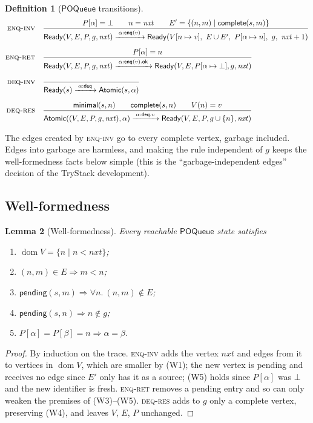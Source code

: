 \documentclass[11pt]{article}
\newtheorem{lemma}{Lemma}[section]
\theoremstyle{definition}
\newtheorem{definition}[lemma]{Definition}
\theoremstyle{remark}
\newcommand{\dom}{\mathop{\mathrm{dom}}}
\newcommand{\Ready}{\mathsf{Ready}}
\newcommand{\Atomic}{\mathsf{Atomic}}
\newcommand{\Enq}{\mathsf{enq}}
\newcommand{\Deq}{\mathsf{deq}}
\newcommand{\ok}{\mathsf{ok}}
\newcommand{\pending}{\mathsf{pending}}
\newcommand{\complete}{\mathsf{complete}}
\newcommand{\minimal}{\mathsf{minimal}}
\newcommand{\POQueue}{\mathsf{POQueue}}
\newcommand{\step}[1]{\xrightarrow{\;#1\;}}
\begin{document}
\begin{definition}[$\POQueue$ transitions]\label{def:poq-steps}
\begin{align*}
\textsc{enq-inv}\quad&
\frac{P[\alpha] = \bot \qquad n = \mathit{nxt} \qquad
  E' = \{(n, m) \mid \complete(s, m)\}}
 {\Ready(V, E, P, g, \mathit{nxt}) \step{\alpha:\Enq(v)}
  \Ready(V[n \mapsto v],\ E \cup E',\ P[\alpha \mapsto n],\ g,\ \mathit{nxt}+1)}
\\[6pt]
\textsc{enq-ret}\quad&
\frac{P[\alpha] = n}
 {\Ready(V, E, P, g, \mathit{nxt}) \step{\alpha:\Enq(v).\ok}
  \Ready(V, E, P[\alpha \mapsto \bot], g, \mathit{nxt})}
\\[6pt]
\textsc{deq-inv}\quad&
\frac{}
 {\Ready(s) \step{\alpha:\Deq} \Atomic(s, \alpha)}
\\[6pt]
\textsc{deq-res}\quad&
\frac{\minimal(s, n) \qquad \complete(s, n) \qquad V(n) = v}
 {\Atomic((V, E, P, g, \mathit{nxt}), \alpha) \step{\alpha:\Deq.v}
  \Ready(V, E, P, g \cup \{n\}, \mathit{nxt})}
\end{align*}
\end{definition}

The edges created by \textsc{enq-inv} go to every complete vertex, garbage
included.  Edges into garbage are harmless, and making the rule independent
of $g$ keeps the well-formedness facts below simple (this is the
``garbage-independent edges'' decision of the TryStack development).

\subsection{Well-formedness}

\begin{lemma}[Well-formedness]\label{lem:wf}
Every reachable $\POQueue$ state satisfies
\begin{enumerate}[label=(W\arabic*),nosep]
\item $\dom V = \{ n \mid n < \mathit{nxt} \}$;
\item $(n, m) \in E \Rightarrow m < n$;
\item $\pending(s, m) \Rightarrow \forall n.\ (n, m) \notin E$;
\item $\pending(s, n) \Rightarrow n \notin g$;
\item $P[\alpha] = P[\beta] = n \Rightarrow \alpha = \beta$.
\end{enumerate}
\end{lemma}

\begin{proof}
By induction on the trace.  \textsc{enq-inv} adds the vertex
$\mathit{nxt}$ and edges from it to vertices in $\dom V$, which are smaller
by (W1); the new vertex is pending and receives no edge since $E'$ only has
it as a source; (W5) holds since $P[\alpha]$ was $\bot$ and the new identifier
is fresh.  \textsc{enq-ret} removes a pending entry and so can only weaken the
premises of (W3)--(W5).  \textsc{deq-res} adds to $g$ only a complete vertex,
preserving (W4), and leaves $V$, $E$, $P$ unchanged.
\end{proof}
\end{document}
